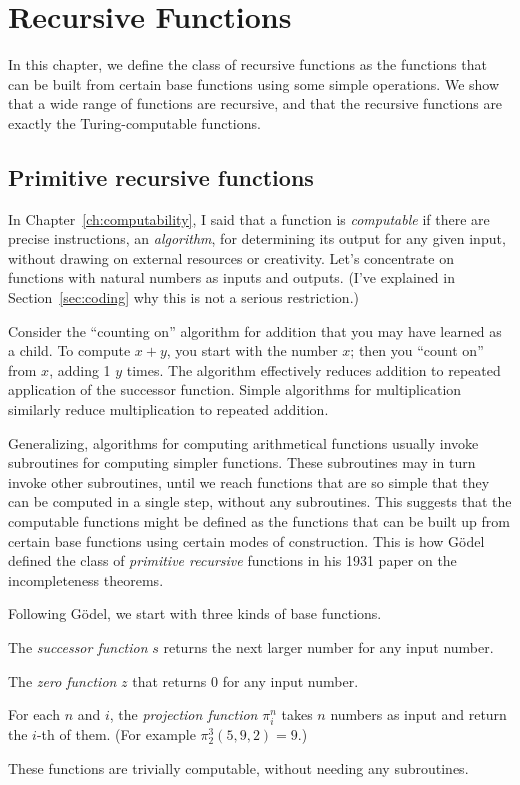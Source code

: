 \setcounter{chapter}{6}
\chapter{Recursive Functions}\label{ch:recursive}

In this chapter,
we define the class of recursive functions as
the functions that can be built from certain base functions
using some simple operations.
We show that a wide range of functions are recursive,
and that the recursive functions are exactly the Turing-computable functions.

\section{Primitive recursive functions}\label{sec:pr-functions}

In Chapter~\ref{ch:computability},
I said that a function is \emph{computable} if
there are precise instructions, an \emph{algorithm},
for determining its output for any given input,
without drawing on external resources or creativity.
Let's concentrate on functions with natural numbers as inputs and outputs.
(I've explained in Section~\ref{sec:coding} why this is not a serious restriction.)

Consider the ``counting on'' algorithm for addition
that you may have learned as a child.
To compute $x + y$,
you start with the number $x$;
then you ``count on'' from $x$,
adding 1 $y$ times.
The algorithm effectively reduces addition to repeated application of the successor function.
Simple algorithms for multiplication
similarly reduce multiplication to repeated addition.

Generalizing,
algorithms for computing arithmetical functions usually
invoke subroutines for computing simpler functions.
These subroutines may in turn invoke other subroutines,
until we reach functions that are so simple that they can be computed in a single step,
without any subroutines.
This suggests that
the computable functions might be defined as the functions that can be built up
from certain base functions
using certain modes of construction.
This is how Gödel defined the class of \emph{primitive recursive} functions
in his 1931 paper on the incompleteness theorems.

Following Gödel,
we start with three kinds of base functions.

\begin{cenumerate}
  \item The \emph{successor function} $s$ returns the next larger number for any input number.

  \item The \emph{zero function} $z$ that returns 0 for any input number.

  \item For each $n$ and $i$, the \emph{projection function} $\pi^{n}_{i}$ takes $n$ numbers as input and return the $i$-th of them. (For example $\pi^{3}_{2}(5,9,2) = 9$.)
\end{cenumerate}
\noindent%
These functions are trivially computable,
without needing any subroutines.


